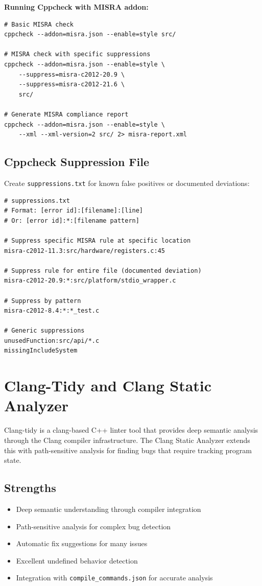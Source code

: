 \documentclass[11pt,letterpaper]{report}
\begin{document}
\textbf{Running Cppcheck with MISRA addon:}

\begin{verbatim}
# Basic MISRA check
cppcheck --addon=misra.json --enable=style src/

# MISRA check with specific suppressions
cppcheck --addon=misra.json --enable=style \
    --suppress=misra-c2012-20.9 \
    --suppress=misra-c2012-21.6 \
    src/

# Generate MISRA compliance report
cppcheck --addon=misra.json --enable=style \
    --xml --xml-version=2 src/ 2> misra-report.xml
\end{verbatim}

\subsection{Cppcheck Suppression File}

Create \texttt{suppressions.txt} for known false positives or documented deviations:

\begin{verbatim}
# suppressions.txt
# Format: [error id]:[filename]:[line]
# Or: [error id]:*:[filename pattern]

# Suppress specific MISRA rule at specific location
misra-c2012-11.3:src/hardware/registers.c:45

# Suppress rule for entire file (documented deviation)
misra-c2012-20.9:*:src/platform/stdio_wrapper.c

# Suppress by pattern
misra-c2012-8.4:*:*_test.c

# Generic suppressions
unusedFunction:src/api/*.c
missingIncludeSystem
\end{verbatim}

\section{Clang-Tidy and Clang Static Analyzer}

Clang-tidy is a clang-based C++ linter tool that provides deep semantic analysis through the Clang compiler infrastructure. The Clang Static Analyzer extends this with path-sensitive analysis for finding bugs that require tracking program state.

\subsection{Strengths}

\begin{itemize}[leftmargin=*]
    \item Deep semantic understanding through compiler integration
    \item Path-sensitive analysis for complex bug detection
    \item Automatic fix suggestions for many issues
    \item Excellent undefined behavior detection
    \item Integration with \texttt{compile\_commands.json} for accurate analysis
\end{itemize}
\end{document}
